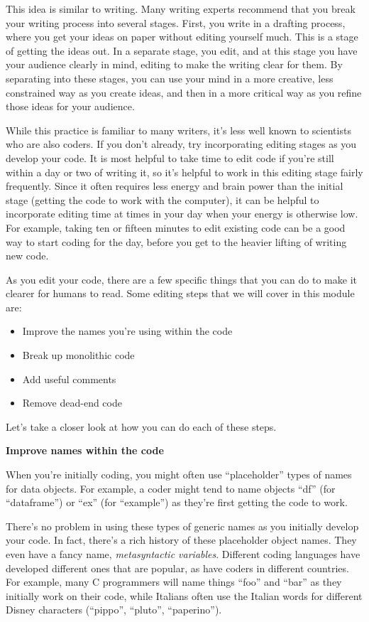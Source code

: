 \documentclass[]{tufte-book}
\providecommand{\tightlist}{%
  \setlength{\itemsep}{0pt}\setlength{\parskip}{0pt}}
\begin{document}
This idea is similar to writing. Many writing experts recommend that you break
your writing process into several stages. First, you write in a drafting
process, where you get your ideas on paper without editing yourself much. This
is a stage of getting the ideas out. In a separate stage, you edit, and at this
stage you have your audience clearly in mind, editing to make the writing clear
for them. By separating into these stages, you can use your mind in a more
creative, less constrained way as you create ideas, and then in a more critical
way as you refine those ideas for your audience.

While this practice is familiar to many writers, it's less well known to
scientists who are also coders. If you don't already, try incorporating editing
stages as you develop your code. It is most helpful to take time to edit code if
you're still within a day or two of writing it, so it's helpful to work in this
editing stage fairly frequently. Since it often requires less energy and brain
power than the initial stage (getting the code to work with the computer), it
can be helpful to incorporate editing time at times in your day when your energy
is otherwise low. For example, taking ten or fifteen minutes to edit existing
code can be a good way to start coding for the day, before you get to the
heavier lifting of writing new code.

As you edit your code, there are a few specific things that you can do to make
it clearer for humans to read. Some editing steps that we will cover in this
module are:

\begin{itemize}
\tightlist
\item
  Improve the names you're using within the code
\item
  Break up monolithic code
\item
  Add useful comments
\item
  Remove dead-end code
\end{itemize}

Let's take a closer look at how you can do each of these steps.

\textbf{Improve names within the code}

When you're initially coding, you might often use ``placeholder'' types of names
for data objects. For example, a coder might tend to name objects ``df'' (for
``dataframe'') or ``ex'' (for ``example'') as they're first getting the code to work.

There's no problem in using these types of generic names as you initially
develop your code. In fact, there's a rich history of these placeholder
object names. They even have a fancy name, \emph{metasyntactic variables}.
Different coding languages have developed different ones that are popular,
as have coders in different countries. For example, many C programmers will
name things ``foo'' and ``bar'' as they initially work on their code, while
Italians often use the Italian words for different Disney characters
(``pippo'', ``pluto'', ``paperino'').
\end{document}
